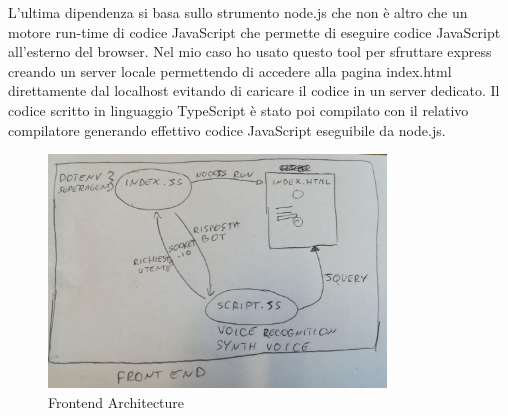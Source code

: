 L'ultima dipendenza si basa sullo strumento node.js che non è altro che un motore run-time di codice JavaScript che permette di eseguire codice JavaScript all'esterno del browser. Nel mio caso ho usato questo tool per sfruttare express creando un server locale permettendo di accedere alla pagina index.html direttamente dal localhost evitando di caricare il codice in un server dedicato.
Il codice scritto in linguaggio TypeScript è stato poi compilato con il relativo compilatore generando effettivo codice JavaScript eseguibile da node.js.
\begin{figure}[H]
 \centering
  \includegraphics[width=0.8\textwidth]{img/frontend.jpg}
 \caption{Frontend Architecture}
\end{figure}

